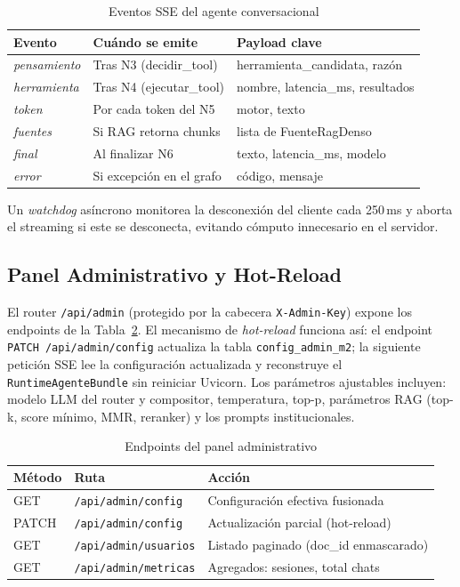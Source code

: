 \documentclass[conference]{IEEEtran}
\newcommand{\code}[1]{\texttt{\small #1}}
\begin{document}
\begin{table}[ht]
\centering
\caption{Eventos SSE del agente conversacional}
\label{tab:sse}
\setlength{\tabcolsep}{3pt}
\begin{tabular}{@{}lll@{}}
\toprule
\textbf{Evento} & \textbf{Cuándo se emite} & \textbf{Payload clave} \\
\midrule
\textit{pensamiento} & Tras N3 (decidir\_tool)    & herramienta\_candidata, razón \\
\textit{herramienta} & Tras N4 (ejecutar\_tool)   & nombre, latencia\_ms, resultados \\
\textit{token}       & Por cada token del N5      & motor, texto \\
\textit{fuentes}     & Si RAG retorna chunks       & lista de FuenteRagDenso \\
\textit{final}       & Al finalizar N6             & texto, latencia\_ms, modelo \\
\textit{error}       & Si excepción en el grafo    & código, mensaje \\
\bottomrule
\end{tabular}
\end{table}

Un \textit{watchdog} asíncrono monitorea la desconexión del cliente cada
250\,ms y aborta el streaming si este se desconecta, evitando cómputo
innecesario en el servidor.

\subsection{Panel Administrativo y Hot-Reload}

El router \code{/api/admin} (protegido por la cabecera \code{X-Admin-Key})
expone los endpoints de la Tabla~\ref{tab:admin}. El mecanismo de
\textit{hot-reload} funciona así: el endpoint \code{PATCH /api/admin/config}
actualiza la tabla \code{config\_admin\_m2}; la siguiente petición SSE lee la
configuración actualizada y reconstruye el \code{RuntimeAgenteBundle} sin
reiniciar Uvicorn. Los parámetros ajustables incluyen: modelo LLM del router y
compositor, temperatura, top-p, parámetros RAG (top-k, score mínimo, MMR,
reranker) y los prompts institucionales.

\begin{table}[ht]
\centering
\caption{Endpoints del panel administrativo}
\label{tab:admin}
\setlength{\tabcolsep}{3pt}
\begin{tabular}{@{}lll@{}}
\toprule
\textbf{Método} & \textbf{Ruta} & \textbf{Acción} \\
\midrule
GET   & \code{/api/admin/config}    & Configuración efectiva fusionada \\
PATCH & \code{/api/admin/config}    & Actualización parcial (hot-reload) \\
GET   & \code{/api/admin/usuarios}  & Listado paginado (doc\_id enmascarado) \\
GET   & \code{/api/admin/metricas}  & Agregados: sesiones, total chats \\
\bottomrule
\end{tabular}
\end{table}
\end{document}
